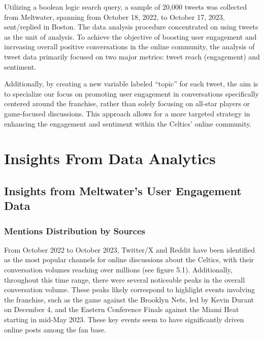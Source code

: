 \documentclass[
]{book}
\begin{document}
Utilizing a boolean logic search query, a sample of 20,000 tweets was collected from Meltwater, spanning from October 18, 2022, to October 17, 2023, sent/replied in Boston. The data analysis procedure concentrated on using tweets as the unit of analysis. To achieve the objective of boosting user engagement and increasing overall positive conversations in the online community, the analysis of tweet data primarily focused on two major metrics: tweet reach (engagement) and sentiment.

Additionally, by creating a new variable labeled ``topic'' for each tweet, the aim is to specialize our focus on promoting user engagement in conversations specifically centered around the franchise, rather than solely focusing on all-star players or game-focused discussions. This approach allows for a more targeted strategy in enhancing the engagement and sentiment within the Celtics' online community.

\hypertarget{insights-from-data-analytics}{%
\chapter{Insights From Data Analytics}\label{insights-from-data-analytics}}

\hypertarget{insights-from-meltwaters-user-engagement-data}{%
\section{Insights from Meltwater's User Engagement Data}\label{insights-from-meltwaters-user-engagement-data}}

\hypertarget{mentions-distribution-by-sources}{%
\subsection{Mentions Distribution by Sources}\label{mentions-distribution-by-sources}}

From October 2022 to October 2023, Twitter/X and Reddit have been identified as the most popular channels for online discussions about the Celtics, with their conversation volumes reaching over millions (see figure 5.1). Additionally, throughout this time range, there were several noticeable peaks in the overall conversation volume. These peaks likely correspond to highlight events involving the franchise, such as the game against the Brooklyn Nets, led by Kevin Durant on December 4, and the Eastern Conference Finals against the Miami Heat starting in mid-May 2023. These key events seem to have significantly driven online posts among the fan base.
\end{document}
